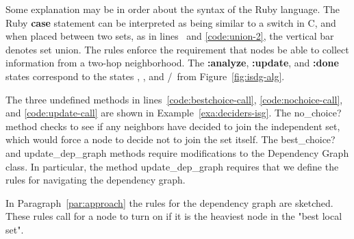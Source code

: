 Some explanation may be in order about the syntax of the Ruby language. The Ruby {\bfseries case} statement can be interpreted as being similar to a switch in C, and when placed between two sets, as in lines~ and \ref{code:union-2}, the vertical bar denotes set union. The rules enforce the requirement that nodes be able to collect information from a two-hop neighborhood. The {\bfseries :analyze}, {\bfseries :update}, and {\bfseries :done} states correspond to the states \cAd, \cUd, and \cId/\cOd\ from Figure~\ref{fig:isdg-alg}. 

The three undefined methods in lines~\ref{code:bestchoice-call}, \ref{code:nochoice-call}, and \ref{code:update-call} are shown in Example~\ref{exa:deciders-isg}. The {\ttfamily no\_choice?} method checks to see if any neighbors have decided to join the independent set, which would force a node to decide not to join the set itself. The {\ttfamily best\_choice?} and {\ttfamily update\_dep\_graph} methods require modifications to the Dependency Graph class. In particular, the method {\ttfamily update\_dep\_graph} requires that we define the rules for navigating the dependency graph. 


In Paragraph~\ref{par:approach} the rules for the dependency graph are sketched. These rules call for a node to turn on if it is the heaviest node in the "best local set". 

